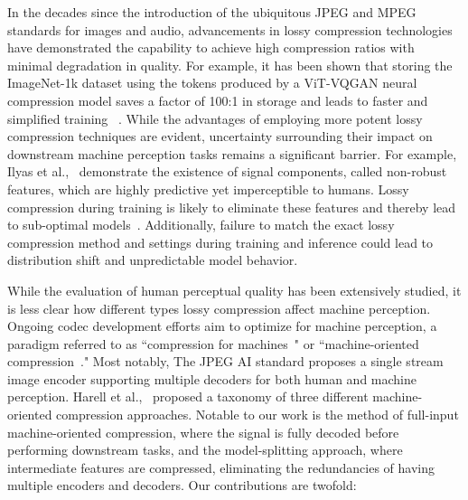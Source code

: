 \documentclass[10pt,twocolumn,letterpaper]{article}
\begin{document}
In the decades since the introduction of the ubiquitous JPEG and MPEG standards for images and audio, advancements in lossy compression technologies have demonstrated the capability to achieve high compression ratios with minimal degradation in quality. For example, it has been shown that storing the ImageNet-1k dataset using the tokens produced by a ViT-VQGAN neural compression model saves a factor of 100:1 in storage and leads to faster and simplified training ~\cite{yu2021vector}\cite{park2023storage}. 
While the advantages of employing more potent lossy compression techniques are evident, uncertainty surrounding their impact on downstream machine perception tasks remains a significant barrier. For example, Ilyas et al.,~\cite{ilyas2019adversarial} demonstrate the existence of signal components, called non-robust features, which are highly predictive yet imperceptible to humans. Lossy compression during training is likely to eliminate these features and thereby lead to sub-optimal models~\cite{aydemir2018effects}. Additionally, failure to match the exact lossy compression method and settings during training and inference could lead to distribution shift and unpredictable model behavior.

While the evaluation of human perceptual quality has been extensively studied, it is less clear how different types lossy compression affect machine perception. Ongoing codec development efforts aim to optimize for machine perception, a paradigm referred to as ``compression for machines~\cite{chamain2021end}" or ``machine-oriented compression~\cite{kang2023super}." Most notably, The JPEG AI standard \cite{ascenso2023jpeg} proposes a single stream image encoder supporting multiple decoders for both human and machine perception. Harell et al.,~\cite{harell2023rate} proposed a taxonomy of three different machine-oriented compression approaches. Notable to our work is the method of full-input machine-oriented compression, where the signal is fully decoded before performing downstream tasks, and the model-splitting approach, where intermediate features are compressed, eliminating the redundancies of having multiple encoders and decoders. Our contributions are twofold:
\end{document}
